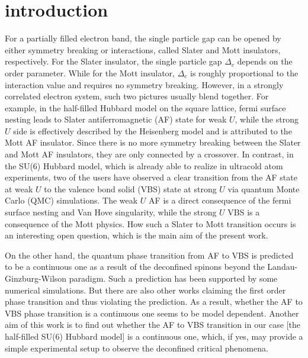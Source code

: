 \documentclass[twocolumn,superscriptaddress]{revtex4-1}
\begin{document}
\section{introduction}
For a partially filled electron band, the single particle gap can be opened by either symmetry breaking or interactions, called Slater \cite{Slater_PR_1951} and Mott \cite{Mott_PPSA_1949} insulators, respectively. For the Slater insulator, the single particle gap $\Delta_c$ depends on the order parameter. While for the Mott insulator, $\Delta_c$ is roughly proportional to the interaction value and requires no symmetry breaking. However, in a strongly correlated electron system, such two pictures usually blend together. \cite{Imada_RMP_1998,Lee_RMP_2006} For example, in the half-filled Hubbard model on the square lattice, fermi surface nesting leads to Slater antiferromagnetic (AF) state for weak $U$, while the strong $U$ side is effectively described by the Heisenberg model and is attributed to the Mott AF insulator. \cite{Hirsch_PRB_1985} Since there is no more symmetry breaking between the Slater and Mott AF insulators, they are only connected by a crossover. \cite{Pruschke_JPCM_2003} In contrast, in the SU(6) Hubbard model, which is already able to realize in ultracold atom experiments, \cite{Wu_PRL_2003,*Wu_MPLB_2006,Honerkamp_PRL_2004,Assaad_PRB_2005,DeSalvo_PRL_2010,*Taie_PRL_2010,Krauser_NP_2012,*Taie_NP_2012,*Zhang_S_2014,Cazalilla_RPP_2014,*Laflamme_AP_2016} two of the users have observed a clear transition from the AF state at weak $U$ to the valence bond solid (VBS) state at strong $U$ via quantum Monte Carlo (QMC) simulations. \cite{Wang_PRL_2014} The weak $U$ AF is a direct consequence of the fermi surface nesting and Van Hove singularity, while the strong $U$ VBS is a consequence of the Mott physics. \cite{Zhou_PRB_2016} How such a Slater to Mott transition occurs is an interesting open question, which is the main aim of the present work.

On the other hand, the quantum phase transition from AF to VBS is predicted to be a continuous one as a result of the deconfined spinons beyond the Landau-Ginzburg-Wilson paradigm. \cite{Senthil_S_2004,*Senthil_PRB_2004,*Levin_PRB_2004} Such a prediction has been supported by some numerical simulations. \cite{Sandvik_PRL_2007,*Melko_PRL_2008,*Sandvik_PRL_2010,*Kaul_PRL_2012,*Pujari_PRL_2013,*Shao_S_2016,*Nahum_PRX_2015,*Wang_PRB_2016,*Assaad_PRX_2016} But there are also other works claiming the first order phase transition and thus violating the prediction. \cite{Kragset_PRL_2006,*Kuklov_AP_2006,*Kuklov_PRL_2008,*Sen_PRB_2010,*Papanikolaou_PRL_2010,*Block_PRL_2013,*DEmidio_PRB_2016,*DEmidio_PRL_2017} As a result, whether the AF to VBS phase transition is a continuous one seems to be model dependent. Another aim of this work is to find out whether the AF to VBS transition in our case [the half-filled SU(6) Hubbard model] is a continuous one, which, if yes, may provide a simple experimental setup to observe the deconfined critical phenomena. 
\end{document}
